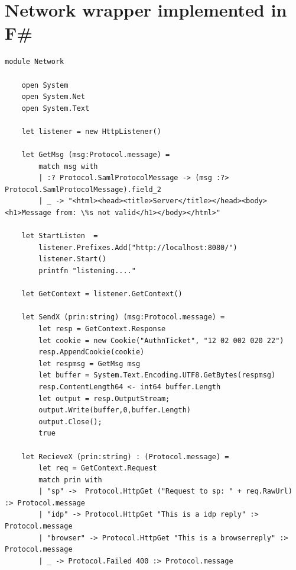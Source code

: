 \documentclass[twosided]{report}
\begin{document}
\section{Network wrapper implemented in F\#}
\begin{lstlisting}[style=fstar, caption={Example of implementation of network functions in F\# \cite{jacob}.}]
	module Network

	open System
	open System.Net
	open System.Text
	
	let listener = new HttpListener()
	
	let GetMsg (msg:Protocol.message) = 
		match msg with
		| :? Protocol.SamlProtocolMessage -> (msg :?> Protocol.SamlProtocolMessage).field_2
		| _ -> "<html><head><title>Server</title></head><body><h1>Message from: \%s not valid</h1></body></html>"
	
	let StartListen  = 
		listener.Prefixes.Add("http://localhost:8080/")
		listener.Start()
		printfn "listening...."
	
	let GetContext = listener.GetContext()
	
	let SendX (prin:string) (msg:Protocol.message) = 
		let resp = GetContext.Response
		let cookie = new Cookie("AuthnTicket", "12 02 002 020 22")
		resp.AppendCookie(cookie)
		let respmsg = GetMsg msg
		let buffer = System.Text.Encoding.UTF8.GetBytes(respmsg)
		resp.ContentLength64 <- int64 buffer.Length
		let output = resp.OutputStream;
		output.Write(buffer,0,buffer.Length)
		output.Close();
		true
	
	let RecieveX (prin:string) : (Protocol.message) =
		let req = GetContext.Request
		match prin with
		| "sp" ->  Protocol.HttpGet ("Request to sp: " + req.RawUrl) :> Protocol.message
		| "idp" -> Protocol.HttpGet "This is a idp reply" :> Protocol.message
		| "browser" -> Protocol.HttpGet "This is a browserreply" :> Protocol.message
		| _ -> Protocol.Failed 400 :> Protocol.message
\end{lstlisting}
\end{document}
